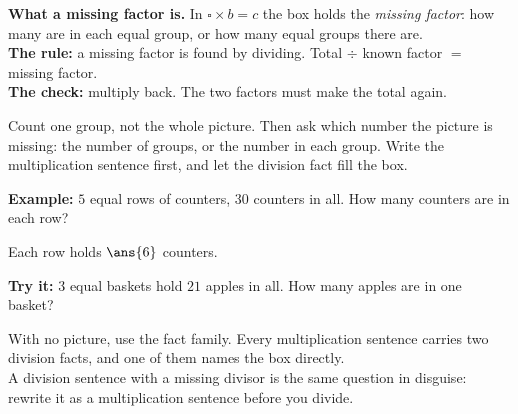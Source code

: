 \documentclass[12pt]{article}
\begin{document}

\begin{formulabox}
\textbf{What a missing factor is.} In $\square \times b = c$ the box holds the
\emph{missing factor}: how many are in each equal group, or how many equal
groups there are.\\[3pt]
\textbf{The rule:} a missing factor is found by dividing. Total $\div$ known
factor $=$ missing factor.\\[3pt]
\textbf{The check:} multiply back. The two factors must make the total again.
\end{formulabox}


\begin{formulabox}
Count one group, not the whole picture. Then ask which number the picture is
missing: the number of groups, or the number in each group. Write the
multiplication sentence first, and let the division fact fill the box.
\end{formulabox}

\begin{examplebox}
\textbf{Example:} $5$ equal rows of counters, $30$ counters in all. How many
counters are in each row?

Each row holds $\ans{6}$ counters.
\end{examplebox}

\begin{tryitbox}
\textbf{Try it:} $3$ equal baskets hold $21$ apples in all. How many apples are
in one basket?\\[2pt]
\end{tryitbox}


\begin{formulabox}
With no picture, use the fact family. Every multiplication sentence carries two
division facts, and one of them names the box directly.\\[3pt]
A division sentence with a missing divisor is the same question in disguise:
rewrite it as a multiplication sentence before you divide.
\end{formulabox}
\end{document}
